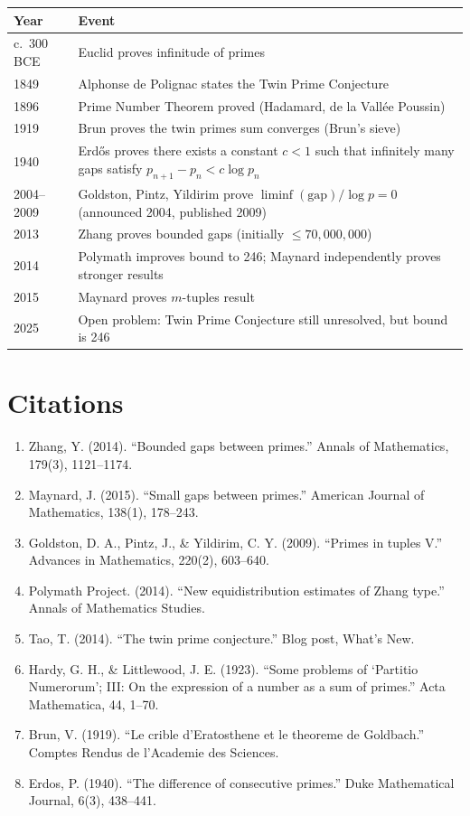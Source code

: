 \begin{tabularx}{\linewidth}{lX}
\toprule
\textbf{Year} & \textbf{Event} \\ \midrule
c.\ 300 BCE & Euclid proves infinitude of primes \\ 
1849 & Alphonse de Polignac states the Twin Prime Conjecture \\ 
1896 & Prime Number Theorem proved (Hadamard, de la Vall\'ee Poussin) \\ 
1919 & Brun proves the twin primes sum converges (Brun's sieve) \cite{brun1919} \\ 
1940 & Erd\H{o}s proves there exists a constant $c < 1$ such that infinitely many gaps satisfy $p_{n+1} - p_n < c \log p_n$ \cite{erdos1940} \\ 
2004--2009 & Goldston, Pintz, Yildirim prove $\liminf (\text{gap})/\log p = 0$ (announced 2004, published 2009) \cite{gpy2009} \\ 
2013 & Zhang proves bounded gaps (initially $\leq 70,000,000$) \cite{zhang2014} \\ 
2014 & Polymath improves bound to 246; Maynard independently proves stronger results \cite{polymath2014,maynard2015} \\ 
2015 & Maynard proves $m$-tuples result \cite{maynard2015} \\ 
2025 & Open problem: Twin Prime Conjecture still unresolved, but bound is 246 \\ \bottomrule
\end{tabularx}

\section{Citations}

\begin{enumerate}
\item Zhang, Y. (2014). ``Bounded gaps between primes.'' Annals of Mathematics, 179(3), 1121--1174.
\item Maynard, J. (2015). ``Small gaps between primes.'' American Journal of Mathematics, 138(1), 178--243.
\item Goldston, D. A., Pintz, J., \& Yildirim, C. Y. (2009). ``Primes in tuples V.'' Advances in Mathematics, 220(2), 603--640.
\item Polymath Project. (2014). ``New equidistribution estimates of Zhang type.'' Annals of Mathematics Studies.
\item Tao, T. (2014). ``The twin prime conjecture.'' Blog post, What's New.
\item Hardy, G. H., \& Littlewood, J. E. (1923). ``Some problems of `Partitio Numerorum'; III: On the expression of a number as a sum of primes.'' Acta Mathematica, 44, 1--70.
\item Brun, V. (1919). ``Le crible d'Eratosthene et le theoreme de Goldbach.'' Comptes Rendus de l'Academie des Sciences.
\item Erdos, P. (1940). ``The difference of consecutive primes.'' Duke Mathematical Journal, 6(3), 438--441.
\end{enumerate}